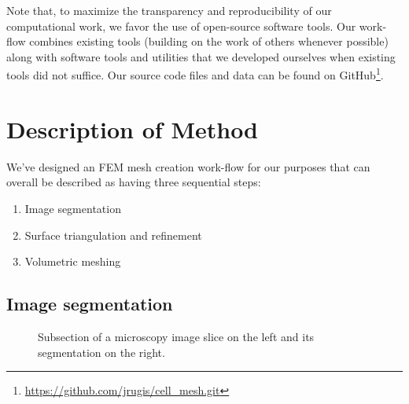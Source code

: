 \documentclass[a4paper,10pt]{article}
\begin{document}
Note that, to maximize the transparency and reproducibility of our computational work, we favor the use of open-source software tools. Our work-flow combines existing tools (building on the work of others whenever possible) along with software tools and utilities that we developed ourselves when existing tools did not suffice. Our source code files and data can be found on GitHub\footnote{\url{https://github.com/jrugis/cell_mesh.git}}.\\

\section{Description of Method}

We've designed an FEM mesh creation work-flow for our purposes that can overall be described as having three sequential steps:
\begin{enumerate}
\item Image segmentation
\item Surface triangulation and refinement
\item Volumetric meshing
\end{enumerate}

\subsection{Image segmentation}

\begin{figure}[H]
\begin{center}
\hspace{0.5cm}
\end{center}
\caption{Subsection of a microscopy image slice on the left and its segmentation on the right.}
\label{fig:slice}
\end{figure}
\end{document}
